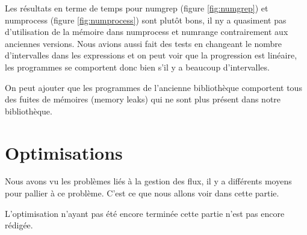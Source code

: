 Les r\'esultats en terme de temps pour numgrep (figure \ref{fig:numgrep}) et numprocess (figure \ref{fig:numprocess}) sont plut\^ot bons, il ny a quasiment pas d'utilisation de la m\'emoire dans numprocess et numrange contrairement aux anciennes versions. 
Nous avions aussi fait des tests en changeant le nombre d'intervalles dans les expressions et on peut voir que la progression est lin\'eaire, les programmes se comportent donc bien s'il y a beaucoup d'intervalles.

On peut ajouter que les programmes de l'ancienne biblioth\`eque comportent tous des fuites de m\'emoires (memory leaks) qui ne sont plus pr\'esent 
dans notre biblioth\`eque.

\section{Optimisations}

Nous avons vu les probl\`emes li\'es \`a la gestion des flux, il y a diff\'erents moyens pour pallier \`a ce probl\`eme.
C'est ce que nous allons voir dans cette partie.

L'optimisation n'ayant pas \'et\'e encore termin\'ee cette partie n'est pas encore r\'edig\'ee.
